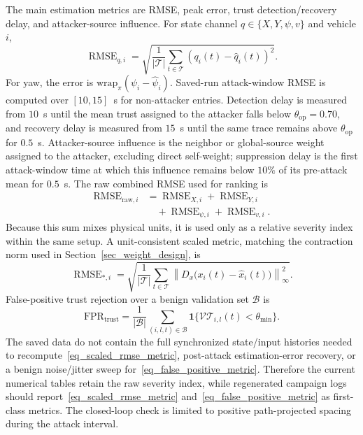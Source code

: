 \documentclass[letterpaper,journal]{IEEEtran}
\def\VT{\mathcal{VT}} %
\begin{document}
The main estimation metrics are RMSE, peak error, trust detection/recovery delay, and attacker-source influence. For state channel $q\in\{X,Y,\psi,v\}$ and vehicle $i$,
\begin{equation}
\operatorname{RMSE}_{q,i}=
\sqrt{\frac{1}{|\mathcal{T}|}\sum_{t\in\mathcal{T}}
\left(q_i(t)-\hat q_i(t)\right)^2}.
\end{equation}
For yaw, the error is $\mathrm{wrap}_{\pi}(\psi_i-\hat\psi_i)$. Saved-run attack-window RMSE is computed over $[10,15]$~s for non-attacker entries. Detection delay is measured from $10$~s until the mean trust assigned to the attacker falls below $\theta_{\mathrm{op}}=0.70$, and recovery delay is measured from $15$~s until the same trace remains above $\theta_{\mathrm{op}}$ for $0.5$~s. Attacker-source influence is the neighbor or global-source weight assigned to the attacker, excluding direct self-weight; suppression delay is the first attack-window time at which this influence remains below $10\%$ of its pre-attack mean for $0.5$~s. The raw combined RMSE used for ranking is
\begin{equation}
\begin{aligned}
\operatorname{RMSE}_{\mathrm{raw},i}
&=\operatorname{RMSE}_{X,i}+\operatorname{RMSE}_{Y,i}\\
&\quad+\operatorname{RMSE}_{\psi,i}+\operatorname{RMSE}_{v,i}.
\end{aligned}
\end{equation}
Because this sum mixes physical units, it is used only as a relative severity index within the same setup. A unit-consistent scaled metric, matching the contraction norm used in Section~\ref{sec_weight_design}, is
\begin{equation}
\operatorname{RMSE}_{*,i}=
\sqrt{\frac{1}{|\mathcal{T}|}\sum_{t\in\mathcal{T}}
\left\|D_x\big(x_i(t)-\hat x_i(t)\big)\right\|_\infty^2}.
\label{eq_scaled_rmse_metric}
\end{equation}
False-positive trust rejection over a benign validation set $\mathcal{B}$ is
\begin{equation}
\mathrm{FPR}_{\mathrm{trust}}=
\frac{1}{|\mathcal{B}|}
\sum_{(i,l,t)\in\mathcal{B}}
\mathbf{1}\{\VT_{i,l}(t)<\theta_{\min}\}.
\label{eq_false_positive_metric}
\end{equation}
The saved data do not contain the full synchronized state/input histories needed to recompute~\eqref{eq_scaled_rmse_metric}, post-attack estimation-error recovery, or a benign noise/jitter sweep for~\eqref{eq_false_positive_metric}. Therefore the current numerical tables retain the raw severity index, while regenerated campaign logs should report~\eqref{eq_scaled_rmse_metric} and~\eqref{eq_false_positive_metric} as first-class metrics. The closed-loop check is limited to positive path-projected spacing during the attack interval.
\end{document}

